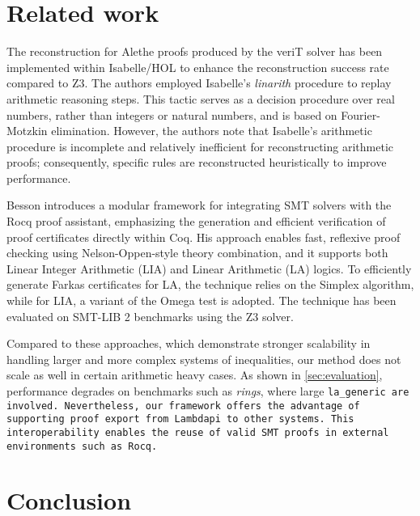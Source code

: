 \documentclass[runningheads]{llncs}
\begin{document}










\section{Related work}
\label{sec:related}

The reconstruction for Alethe proofs produced by the veriT solver has been implemented within Isabelle/HOL to enhance the reconstruction success rate compared to Z3.
The authors employed Isabelle's \emph{linarith} procedure to replay arithmetic reasoning steps. This tactic serves as a decision procedure over real numbers, rather than integers or natural numbers, and is based on Fourier-Motzkin elimination.
However, the authors note that Isabelle's arithmetic procedure is incomplete and relatively inefficient for reconstructing arithmetic proofs; consequently, specific rules are reconstructed heuristically to improve performance.

Besson \cite{micromega} introduces a modular framework for integrating SMT solvers with the Rocq proof assistant, emphasizing the generation and efficient verification of proof certificates directly within Coq.
His approach enables fast, reflexive proof checking using Nelson-Oppen-style theory combination, and it supports both Linear Integer Arithmetic (LIA) and Linear Arithmetic (LA) logics.
To efficiently generate Farkas certificates for LA, the technique relies on the Simplex algorithm, while for LIA, a variant of the Omega test \cite{omegatest} is adopted.
The technique has been evaluated on SMT-LIB 2 benchmarks using the Z3 solver.

Compared to these approaches, which demonstrate stronger scalability in handling larger and more complex systems of inequalities, our method does not scale as well in certain arithmetic heavy cases.
As shown in \cref{sec:evaluation}, performance degrades on benchmarks such as \emph{rings}, where large \tt{la\_generic} are involved.
Nevertheless, our framework offers the advantage of supporting proof export from Lambdapi to other systems. This interoperability enables the reuse of valid SMT proofs in external environments such as Rocq.


\section{Conclusion}
\label{sec:conclusion}
\end{document}
